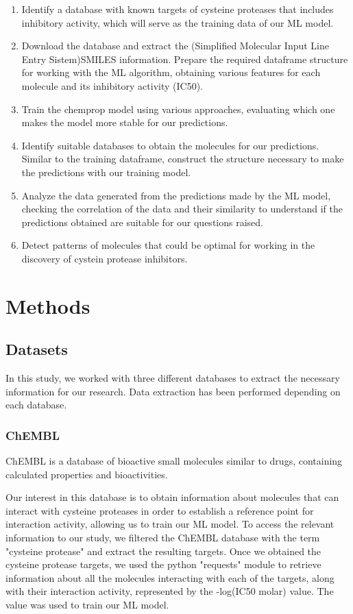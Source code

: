 \documentclass[final,times,twocolumn,article]{elsarticle}
\begin{document}
\begin{enumerate}
    \item Identify a database with known targets of cysteine proteases that includes inhibitory activity, which will serve as the training data of our ML model. 
    \item Download the database and extract the (Simplified Molecular Input Line Entry Sistem)SMILES information. Prepare the required dataframe structure for working with the ML algorithm, obtaining various features for each molecule and its inhibitory activity (IC50).
    \item Train the chemprop model using various approaches, evaluating which one makes the model more stable for our predictions. 
    \item Identify suitable databases to obtain the molecules for our predictions. Similar to the training dataframe, construct the structure necessary to make the predictions with our training model. 
    \item Analyze the data generated from the predictions made by the ML model, checking the correlation of the data and their similarity to understand if the predictions obtained are suitable for our questions raised. 
    \item Detect patterns of molecules that could be optimal for working in the discovery of cystein protease inhibitors. 
\end{enumerate}

\section{Methods}

\subsection{Datasets}

In this study, we worked with three different databases to extract the necessary information for our research. Data extraction has been performed depending on each database.  

\subsubsection{ChEMBL}

ChEMBL is a database of bioactive small molecules similar to drugs, containing calculated properties and bioactivities. \cite{chemblweb}

Our interest in this database is to obtain information about molecules that can interact with cysteine proteases in order to establish a reference point for interaction activity, allowing us to train our ML model. To access the relevant information to our study, we filtered the ChEMBL database with the term "cysteine protease" and extract the resulting targets. Once we obtained the cysteine protease targets, we used the python "requests" module to retrieve information about all the molecules interacting with each of the targets, along with their interaction activity, represented by the -log(IC50 molar) value. The value was used to train our ML model. 
\end{document}
